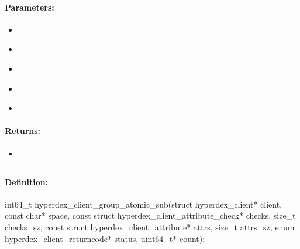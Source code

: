 \paragraph{Parameters:}
\begin{itemize}[noitemsep]
\item {}\\

\item {}\\

\item {}\\

\item {}\\

\item {}\\

\end{itemize}

\paragraph{Returns:}
\begin{itemize}[noitemsep]
\item {}\\

\end{itemize}

\pagebreak
\subsection{}
\label{api:c:group_atomic_sub}


\paragraph{Definition:}
\begin{ccode}
int64_t hyperdex_client_group_atomic_sub(struct hyperdex_client* client,
        const char* space,
        const struct hyperdex_client_attribute_check* checks, size_t checks_sz,
        const struct hyperdex_client_attribute* attrs, size_t attrs_sz,
        enum hyperdex_client_returncode* status,
        uint64_t* count);
\end{ccode}

